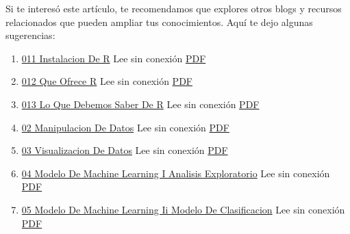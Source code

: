 \documentclass[
  jou,
  floatsintext,
  longtable,
  a4paper,
  nolmodern,
  notxfonts,
  notimes,
  colorlinks=true,linkcolor=blue,citecolor=blue,urlcolor=blue]{apa7}
\providecommand{\tightlist}{%
  \setlength{\itemsep}{0pt}\setlength{\parskip}{0pt}}
\begin{document}
Si te interesó este artículo, te recomendamos que explores otros blogs y
recursos relacionados que pueden ampliar tus conocimientos. Aquí te dejo
algunas sugerencias:

\begin{enumerate}
\def\labelenumi{\arabic{enumi}.}
\tightlist
\item
  \href{https://achalmaedison.netlify.app/programacion-software/r/2020-06-10-011-instalacion-de-r}{011
  Instalacion De R} Lee sin conexión
  \href{https://achalmaedison.netlify.app/programacion-software/r/2020-06-10-011-instalacion-de-r/index.pdf}{PDF}
\item
  \href{https://achalmaedison.netlify.app/programacion-software/r/2020-06-10-012-que-ofrece-r}{012
  Que Ofrece R} Lee sin conexión
  \href{https://achalmaedison.netlify.app/programacion-software/r/2020-06-10-012-que-ofrece-r/index.pdf}{PDF}
\item
  \href{https://achalmaedison.netlify.app/programacion-software/r/2020-06-10-013-lo-que-debemos-saber-de-r}{013
  Lo Que Debemos Saber De R} Lee sin conexión
  \href{https://achalmaedison.netlify.app/programacion-software/r/2020-06-10-013-lo-que-debemos-saber-de-r/index.pdf}{PDF}
\item
  \href{https://achalmaedison.netlify.app/programacion-software/r/2021-04-05-02-manipulacion-de-datos}{02
  Manipulacion De Datos} Lee sin conexión
  \href{https://achalmaedison.netlify.app/programacion-software/r/2021-04-05-02-manipulacion-de-datos/index.pdf}{PDF}
\item
  \href{https://achalmaedison.netlify.app/programacion-software/r/2021-04-12-03-visualizacion-de-datos}{03
  Visualizacion De Datos} Lee sin conexión
  \href{https://achalmaedison.netlify.app/programacion-software/r/2021-04-12-03-visualizacion-de-datos/index.pdf}{PDF}
\item
  \href{https://achalmaedison.netlify.app/programacion-software/r/2022-11-07-04-modelo-de-machine-learning-i-analisis-exploratorio}{04
  Modelo De Machine Learning I Analisis Exploratorio} Lee sin conexión
  \href{https://achalmaedison.netlify.app/programacion-software/r/2022-11-07-04-modelo-de-machine-learning-i-analisis-exploratorio/index.pdf}{PDF}
\item
  \href{https://achalmaedison.netlify.app/programacion-software/r/2022-11-14-05-modelo-de-machine-learning-ii-modelo-de-clasificacion}{05
  Modelo De Machine Learning Ii Modelo De Clasificacion} Lee sin
  conexión
  \href{https://achalmaedison.netlify.app/programacion-software/r/2022-11-14-05-modelo-de-machine-learning-ii-modelo-de-clasificacion/index.pdf}{PDF}

\end{enumerate}
\end{document}
